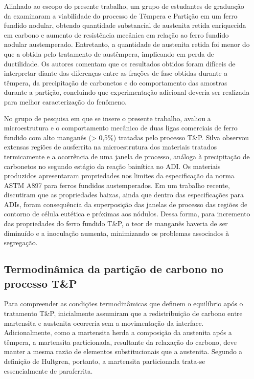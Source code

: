 Alinhado ao escopo do presente trabalho, um grupo de estudantes de graduação da  examinaram a viabilidade do processo de Têmpera e Partição em um ferro fundido nodular, obtendo quantidade substancial de austenita retida enriquecida em carbono e aumento de resistência mecânica em relação ao ferro fundido nodular austemperado. Entretanto, a quantidade de austenita retida foi menor do que a obtida pelo tratamento de austêmpera, implicando em perda de ductilidade. Os autores comentam que os resultados obtidos foram difíceis de interpretar diante das diferenças entre as frações de fase obtidas durante a têmpera, da precipitação de carbonetos e do comportamento das amostras durante a partição, concluindo que experimentação adicional deveria ser realizada para melhor caracterização do fenômeno\cite{Speer2004}.

No grupo de pesquisa em que se insere o presente trabalho,  avaliou a microestrutura e o comportamento mecânico de duas ligas comerciais de ferro fundido com alto manganês (> 0,5\%) tratadas pelo processo T\&P. Silva observou extensas regiões de ausferrita na microestrutura dos materiais tratados termicamente e a ocorrência de uma janela de processo, análoga à precipitação de carbonetos no segundo estágio da reação bainítica no ADI. Os materiais produzidos apresentaram propriedades nos limites da especificação da norma ASTM A897 para ferros fundidos austemperados. Em um trabalho recente,  discutiram que as propriedades baixas, ainda que dentro das especificações para ADIs, foram consequência da superposição das janelas de processo das regiões de contorno de célula eutética e próximas aos nódulos. Dessa forma, para incremento das propriedades do ferro fundido T\&P, o teor de manganês haveria de ser diminuído e a inoculação aumenta, minimizando os problemas associados à segregação.


\subsection{Termodinâmica da partição de carbono no processo T\&P}

Para compreender as condições termodinâmicas que definem o equilíbrio após o tratamento T\&P,  inicialmente assumiram que a redistribuição de carbono entre martensita e austenita ocorreria sem a movimentação da interface. Adicionalmente, como a martensita herda a composição da austenita após a têmpera, a martensita particionada, resultante da relaxação do carbono, deve manter a mesma razão de elementos substitucionais que a austenita. Segundo a definição de Hultgren, portanto, a martensita particionada trata-se essencialmente de paraferrita.

